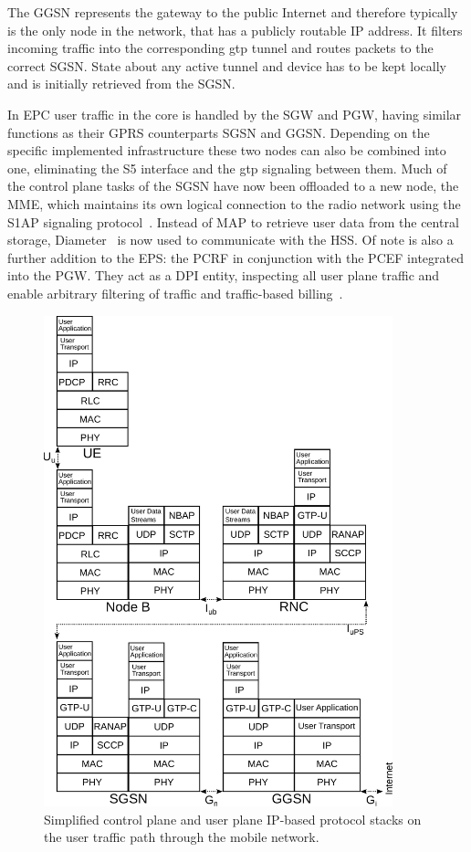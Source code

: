The \gls{GGSN} represents the gateway to the public Internet and therefore typically is the only node in the network, that has a publicly routable \gls{IP} address. It filters incoming traffic into the corresponding \gls{gtp} tunnel and routes packets to the correct \gls{SGSN}. State about any active tunnel and device has to be kept locally and is initially retrieved from the \gls{SGSN}.

In \gls{EPC} user traffic in the core is handled by the \gls{SGW} and \gls{PGW}, having similar functions as their \gls{GPRS} counterparts \gls{SGSN} and \gls{GGSN}. Depending on the specific implemented infrastructure these two nodes can also be combined into one, eliminating the S5 interface and the \gls{gtp} signaling between them. Much of the control plane tasks of the \gls{SGSN} have now been offloaded to a new node, the \gls{MME}, which maintains its own logical connection to the radio network using the \gls{S1AP} signaling protocol~\cite{3gpp.36.413}. Instead of \gls{MAP} to retrieve user data from the central storage, Diameter~\cite{rfc6733} is now used to communicate with the \gls{HSS}. Of note is also a further addition to the \gls{EPS}: the \gls{PCRF} in conjunction with the \gls{PCEF} integrated into the \gls{PGW}. They act as a \gls{DPI} entity, inspecting all user plane traffic and enable arbitrary filtering of traffic and traffic-based billing~\cite{3gpp.23.203}. 

\begin{figure}[htbp]
	\centering
 	\includegraphics[width=0.9\textwidth]{images/umts-userpath-stack.pdf}
 	\caption{Simplified control plane and user plane \gls{IP}-based protocol stacks on the user traffic path through the mobile network.}
 	\label{c4:fig:protocolstacks}
\end{figure}

